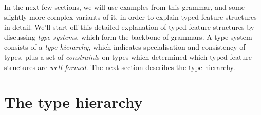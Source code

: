 \documentclass[12pt]{report}
\newcommand{\newterm}[1]{{\it #1}}
\begin{document}
In the next few sections, we will use examples from this grammar, and some
slightly more complex variants of it, in order to explain 
typed feature structures in detail.
We'll start
off this detailed explanation of typed feature structures
by discussing \newterm{type system}s,
which form the backbone of grammars. 
A type system consists of a \newterm{type hierarchy}, which
indicates specialisation and consistency
of types, plus a set of \newterm{constraint}s
on types which determined which typed feature structures are 
\newterm{well-formed}.
The next section describes the type hierarchy.

\section{The type hierarchy}
\label{easythier}
\end{document}
